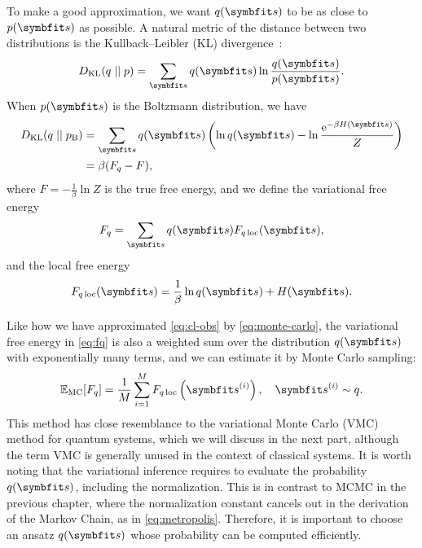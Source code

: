 To make a good approximation, we want $q(\vs)$ to be as close to $p(\vs)$ as possible. A natural metric of the distance between two distributions is the Kullback--Leibler (KL) divergence~\cite{kullback1951information}:
\begin{equation}
D_\text{KL}(q \mid\mid p) = \sum_\vs q(\vs) \ln \frac{q(\vs)}{p(\vs)}.
\end{equation}
When $p(\vs)$ is the Boltzmann distribution, we have
\begin{align}
D_\text{KL}(q \mid\mid p_\text{B}) &= \sum_\vs q(\vs) \left( \ln q(\vs) - \ln \frac{\rme^{-\beta H(\vs)}}{Z} \right) \\
&= \beta (F_q - F),
\label{eq:kl-fq}
\end{align}
where $F = -\frac{1}{\beta} \ln Z$ is the true free energy, and we define the variational free energy
\begin{equation}
F_q = \sum_\vs q(\vs) F_{q\,\text{loc}}(\vs),
\label{eq:fq}
\end{equation}
and the local free energy
\begin{equation}
F_{q\,\text{loc}}(\vs) = \frac{1}{\beta} \ln q(\vs) + H(\vs).
\label{eq:fq-loc}
\end{equation}

Like how we have approximated \cref{eq:cl-obs} by \cref{eq:monte-carlo}, the variational free energy in \cref{eq:fq} is also a weighted sum over the distribution $q(\vs)$ with exponentially many terms, and we can estimate it by Monte Carlo sampling:
\begin{equation}
\bbE_\text{MC}[F_q] = \frac{1}{M} \sum_{i = 1}^M F_{q\,\text{loc}}\left( \vs^{(i)} \right), \quad
\vs^{(i)} \sim q.
\label{eq:fq-monte-carlo}
\end{equation}
This method has close resemblance to the variational Monte Carlo (VMC) method for quantum systems, which we will discuss in the next part, although the term VMC is generally unused in the context of classical systems. It is worth noting that the variational inference requires to evaluate the probability $q(\vs)$, including the normalization. This is in contrast to MCMC in the previous chapter, where the normalization constant cancels out in the derivation of the Markov Chain, as in \cref{eq:metropolis}. Therefore, it is important to choose an ansatz $q(\vs)$ whose probability can be computed efficiently.


